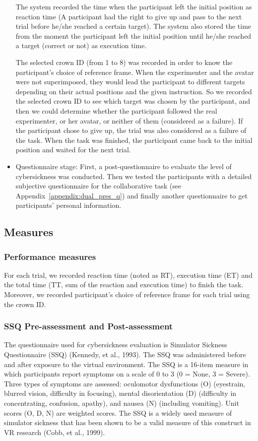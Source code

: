 \begin{itemize}
The system recorded the time when the participant left the initial position as reaction time (A participant had the right to give up and pass to the next trial before he/she reached a certain target). The system also stored the time from the moment the participant left the initial position until he/she reached a target (correct or not) as execution time.

The selected crown ID (from 1 to 8) was recorded in order to know the participant's choice of reference frame. When the experimenter and the avatar were not superimposed, they would lead the participant to different targets depending on their actual positions and the given instruction. So we recorded the selected crown ID to see which target was chosen by the participant, and then we could determine whether the participant followed the real experimenter, or her avatar, or neither of them (considered as a failure). If the participant chose to give up, the trial was also considered as a failure of the task. When the task was finished, the participant came back to the initial position and waited for the next trial.

\item Questionnaire stage: First, a post-questionnaire to evaluate the level of cybersickness was conducted. Then we tested the participants with a detailed subjective questionnaire for the collaborative task (see Appendix~\ref{appendix:dual_pres_q}) and finally another questionnaire to get participants' personal information.
\end{itemize}


\subsection{Measures}
\subsubsection{Performance measures}
For each trial, we recorded reaction time (noted as RT), execution time (ET) and the total time (TT, sum of the reaction and execution time) to finish the task. Moreover, we recorded participant's choice of reference frame for each trial using the crown ID.

\subsubsection{SSQ Pre-assessment and Post-assessment}
The questionnaire used for cybersickness evaluation is Simulator Sickness Questionnaire (SSQ) (Kennedy, et al., 1993). The SSQ was administered before and after exposure to the virtual environment. The SSQ is a 16-item measure in which participants report symptoms on a scale of 0 to 3 (0 = None, 3 = Severe). Three types of symptoms are assessed: oculomotor dysfunctions (O) (eyestrain, blurred vision, difficulty in focusing), mental disorientation (D) (difficulty in concentrating, confusion, apathy), and nausea (N) (including vomiting). Unit scores (O, D, N) are weighted scores. The SSQ is a widely used measure of simulator sickness that has been shown to be a valid measure of this construct in VR research (Cobb, et al., 1999).

